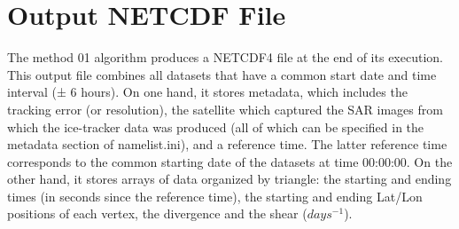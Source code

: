 \documentclass[draft]{agujournal2018}
\begin{document}
\section{Output NETCDF File}

The method 01 algorithm produces a NETCDF4 file at the end of its execution. This output file combines all datasets that have a common start date and time interval (± 6 hours). On one hand, it stores metadata, which includes the tracking error (or resolution), the satellite which captured the SAR images from which the ice-tracker data was produced (all of which can be specified in the metadata section of namelist.ini), and a reference time. The latter reference time corresponds to the common starting date of the datasets at time 00:00:00. On the other hand, it stores arrays of data organized by triangle: the starting and ending times (in seconds since the reference time), the starting and ending Lat/Lon positions of each vertex, the divergence and the shear ($days^{-1}$).
\end{document}
